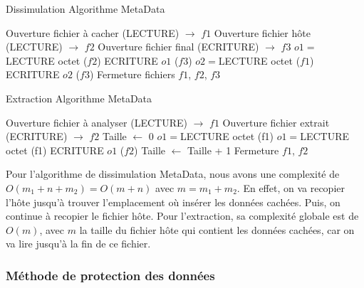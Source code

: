 \documentclass[11pt]{article}
\begin{document}
\begin{minipage}{.5\textwidth}
\begin{algorithm}[H]
\caption{Dissimulation Algorithme MetaData}
\begin{algorithmic}
\STATE \footnotesize Ouverture fichier à cacher (LECTURE) $\rightarrow$ $f1$
\STATE Ouverture fichier hôte (LECTURE) $\rightarrow$ $f2$
\STATE Ouverture fichier final (ECRITURE) $\rightarrow$ $f3$
\STATE $o1 = $LECTURE octet ($f2$)
\STATE ECRITURE $o1$ ($f3$)
\STATE $o2 = $LECTURE octet ($f1$)
\STATE ECRITURE $o2$  ($f3$)
\ENDWHILE
\ENDIF
\ENDWHILE
\STATE Fermeture fichiers $f1$, $f2$, $f3$
\end{algorithmic}
\end{algorithm}
\normalsize
\end{minipage}
\begin{minipage}{.5\textwidth}
\begin{algorithm}[H]
\caption{Extraction Algorithme MetaData}
\begin{algorithmic}
\STATE \footnotesize Ouverture fichier à analyser (LECTURE) $\rightarrow$ $f1$
\STATE Ouverture fichier extrait (ECRITURE) $\rightarrow$ $f2$
\STATE Taille $\leftarrow$ 0
\STATE $o1 = $LECTURE octet (f1)
\STATE $o1 = $LECTURE octet (f1)
\STATE ECRITURE $o1$ ($f2$)
\STATE Taille $\leftarrow$ Taille + 1
\ENDWHILE
\ENDIF
\ENDWHILE
\STATE Fermeture $f1$, $f2$
\end{algorithmic}
\end{algorithm}
\normalsize
\end{minipage}

Pour l'algorithme de dissimulation MetaData, nous avons une complexité de 
$O(m_1+n+m_2)=O(m+n)$ avec $m=m_1+m_2$. En effet, on va recopier l'hôte 
jusqu'à trouver l'emplacement où insérer les données cachées. Puis, on 
continue à recopier le fichier hôte. \newline
Pour l'extraction, sa complexité globale est de $O(m)$, avec $m$ la taille 
du fichier hôte qui contient les données cachées, car on va lire jusqu'à 
la fin de ce fichier. 

\subsubsection{Méthode de protection des données}
\end{document}
